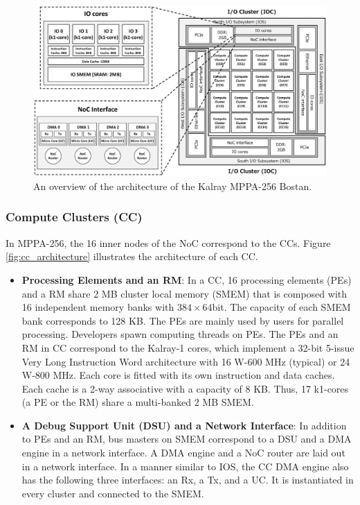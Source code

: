 \documentclass{sig-alternate-05-2015}
\begin{document}
\begin{figure}[t]
  \centering
  \includegraphics[width=1.0\linewidth]{../figure/mppa_architecture.eps}
  \caption{\label{fig:mppa_architecture}
    An overview of the architecture of the Kalray MPPA-256 Bostan.}
\end{figure}

\subsubsection{Compute Clusters (CC)}
\label{sec:cc}
In MPPA-256, the 16 inner nodes of the NoC correspond to the CCs.
Figure \ref{fig:cc_architecture} illustrates the architecture of each CC.

\begin{itemize}
\item \textbf{Processing Elements and an RM}:
In a CC, 16 processing elements (PEs) and a RM share 2 MB cluster local memory (SMEM) that is composed with 16 independent memory banks with $384\times 64 $bit.
The capacity of each SMEM bank corresponds to 128 KB.
The PEs are mainly used by users for parallel processing.
Developers spawn computing threads on PEs.
The PEs and an RM in CC correspond to the Kalray-1 cores, which implement a 32-bit 5-issue Very Long Instruction Word architecture with 16 W-600 MHz (typical) or 24 W-800 MHz.
Each core is fitted with its own instruction and data caches.
Each cache is a 2-way associative with a capacity of 8 KB.
Thus, 17 k1-cores (a PE or the RM) share a multi-banked 2 MB SMEM.

\item \textbf{A Debug Support Unit (DSU) and a Network Interface}:
In addition to PEs and an RM, bus masters on SMEM correspond to a DSU and a DMA engine in a network interface.
A DMA engine and a NoC router are laid out in a network interface.
In a manner similar to IOS, the CC DMA engine also has the following three interfaces: an Rx, a Tx, and a UC. 
It is instantiated in every cluster and connected to the SMEM.
\end{itemize}
\end{document}
